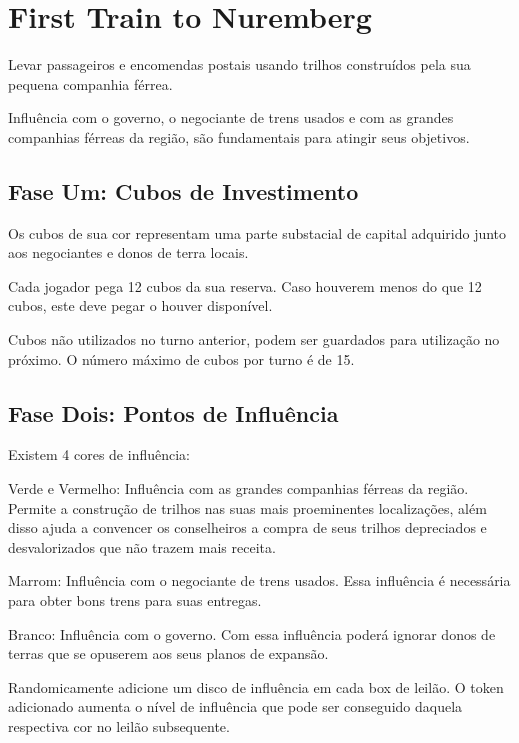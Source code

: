 \documentclass[11pt]{article}
\author{Fabio Favero Henkes}
\date{\today}
\title{}
\begin{document}
\tableofcontents

\section{First Train to Nuremberg}
\label{sec:org06463dc}

Levar passageiros e encomendas postais usando trilhos construídos pela sua pequena companhia férrea.

Influência com o governo, o negociante de trens usados e com as grandes companhias férreas da região, são fundamentais para atingir seus objetivos.

\subsection{Fase Um: Cubos de Investimento}
\label{sec:orgfff61bb}

Os cubos de sua cor representam uma parte substacial de capital adquirido junto aos negociantes e donos de terra locais.

Cada jogador pega 12 cubos da sua reserva. Caso houverem menos do que 12 cubos, este deve pegar o houver disponível.

Cubos não utilizados no turno anterior, podem ser guardados para utilização no próximo. O número máximo de cubos por turno é de 15.

\subsection{Fase Dois: Pontos de Influência}
\label{sec:orge49dab7}

Existem 4 cores de influência:

Verde e Vermelho: Influência com as grandes companhias férreas da região. Permite a construção de trilhos nas suas mais proeminentes localizações,
além disso ajuda a convencer os conselheiros a compra de seus trilhos depreciados e desvalorizados que não trazem mais receita.

Marrom: Influência com o negociante de trens usados. Essa influência é necessária para obter bons trens para suas entregas.

Branco: Influência com o governo. Com essa influência poderá ignorar donos de terras que se opuserem aos seus planos de expansão.

Randomicamente adicione um disco de influência em cada box de leilão. O token adicionado aumenta o nível de influência que pode ser conseguido daquela respectiva cor
no leilão subsequente.
\end{document}
